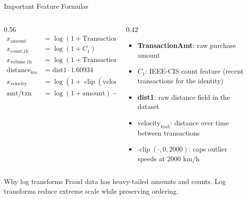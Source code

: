 \documentclass[aspectratio=169,10pt]{beamer}
\begin{document}
\begin{frame}{Important Feature Formulas}
  \begin{columns}[T]
    \begin{column}{0.56\textwidth}
      \begin{align*}
        x_{\text{amount}} &= \log(1 + \text{TransactionAmt}) \\
        x_{\text{count,1h}} &= \log(1 + C_1) \\
        x_{\text{volume,1h}} &= \log(1 + \text{TransactionAmt} \cdot C_1) \\
        \text{distance}_{km} &= \text{dist1} \cdot 1.60934 \\
        x_{\text{velocity}} &= \log(1 + \operatorname{clip}(\text{velocity}_{kmh},0,2000)) \\
        \text{amt/txn} &= \log(1+\text{amount}) - \log(1+\text{count}+0.1)
      \end{align*}
    \end{column}
    \begin{column}{0.42\textwidth}
      \footnotesize
      \begin{itemize}
        \item \textbf{TransactionAmt}: raw purchase amount
        \item \(C_1\): IEEE-CIS count feature (recent transactions for the identity)
        \item \textbf{dist1}: raw distance field in the dataset
        \item \(\text{velocity}_{kmh}\): distance over time between transactions
        \item \(\operatorname{clip}(\cdot,0,2000)\): caps outlier speeds at 2000 km/h
      \end{itemize}
    \end{column}
  \end{columns}
  \begin{block}{Why log transforms}
    Fraud data has heavy-tailed amounts and counts. Log transforms reduce extreme scale while preserving ordering.
  \end{block}
\end{frame}
\end{document}
